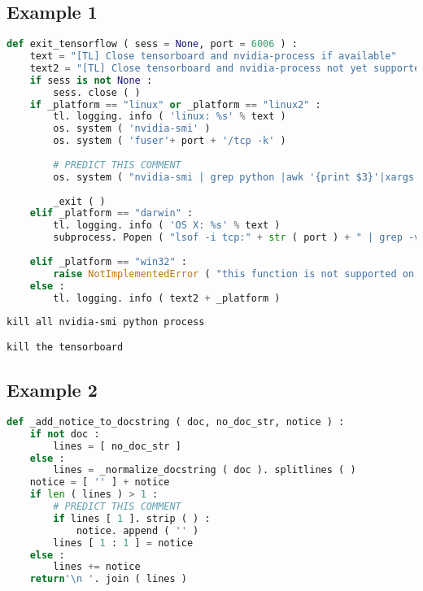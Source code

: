 \subsection{Example 1}
    \begin{lstlisting}[language=Python, caption={Input code}]
def exit_tensorflow ( sess = None, port = 6006 ) : 
    text = "[TL] Close tensorboard and nvidia-process if available" 
    text2 = "[TL] Close tensorboard and nvidia-process not yet supported by this function (tl.ops.exit_tf) on " 
    if sess is not None : 
        sess. close ( ) 
    if _platform == "linux" or _platform == "linux2" : 
        tl. logging. info ( 'linux: %s' % text ) 
        os. system ( 'nvidia-smi' ) 
        os. system ( 'fuser'+ port + '/tcp -k' ) 
 
        # PREDICT THIS COMMENT
        os. system ( "nvidia-smi | grep python |awk '{print $3}'|xargs kill" ) 
 
        _exit ( ) 
    elif _platform == "darwin" : 
        tl. logging. info ( 'OS X: %s' % text ) 
        subprocess. Popen ( "lsof -i tcp:" + str ( port ) + " | grep -v PID | awk '{print $2}' | xargs kill", shell = True ) 
 
    elif _platform == "win32" : 
        raise NotImplementedError ( "this function is not supported on the Windows platform" ) 
    else : 
        tl. logging. info ( text2 + _platform ) 
    \end{lstlisting}
    
    \begin{lstlisting}[caption={Label}]
kill all nvidia-smi python process
    \end{lstlisting}
    \begin{lstlisting}[caption={Prediction}]
kill the tensorboard
    \end{lstlisting}


\subsection{Example 2}
    \begin{lstlisting}[language=Python, caption={Input code}]
def _add_notice_to_docstring ( doc, no_doc_str, notice ) : 
    if not doc : 
        lines = [ no_doc_str ] 
    else : 
        lines = _normalize_docstring ( doc ). splitlines ( ) 
    notice = [ '' ] + notice 
    if len ( lines ) > 1 : 
        # PREDICT THIS COMMENT
        if lines [ 1 ]. strip ( ) : 
            notice. append ( '' ) 
        lines [ 1 : 1 ] = notice 
    else : 
        lines += notice 
    return'\n '. join ( lines ) 
    \end{lstlisting}
    
